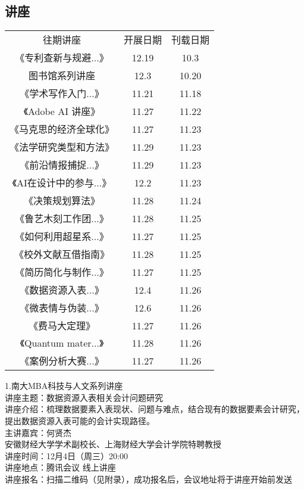 \documentclass[letterpaper, 12pt]{article}
\begin{document}
\begin{multicols}{2}

\section{讲座}
\begin{tabular}{|c|c|c|}
    \hline
    往期讲座 & 开展日期 & 刊载日期\\
    《专利查新与规避...》 & 12.19 & 10.3\\
    图书馆系列讲座 & 12.3 & 10.20\\
    《学术写作入门...》& 11.21 & 11.18\\
    《Adobe AI 讲座》 & 11.27 & 11.22\\
    《马克思的经济全球化》 & 11.27 & 11.23\\
    《法学研究类型和方法》 & 11.29 & 11.23\\
    《前沿情报捕捉...》 & 11.29 & 11.23\\
    《AI在设计中的参与...》 & 12.2 & 11.23\\
    《决策规划算法》 & 11.28 & 11.24\\
    《鲁艺木刻工作团...》 & 11.28 & 11.25\\
    《如何利用超星系...》 & 11.27 & 11.25\\
    《校外文献互借指南》 & 11.28 & 11.25\\
    《简历简化与制作...》 & 11.27 & 11.25\\
    《数据资源入表...》 & 12.4 & 11.26\\
    《微表情与伪装...》 & 12.6 & 11.26\\
    《费马大定理》 & 11.27 & 11.26\\
    《Quantum mater...》 & 11.28 & 11.26\\
    《案例分析大赛...》 & 11.27 & 11.26\\
    \hline\hline

    
    \hline
\end{tabular}

1.南大MBA科技与人文系列讲座\\
讲座主题：数据资源入表相关会计问题研究\\
讲座介绍：梳理数据要素入表现状、问题与难点，结合现有的数据要素会计研究，提出数据资源入表可能的会计实现路径。\\
主讲嘉宾：何贤杰\\
安徽财经大学学术副校长、上海财经大学会计学院特聘教授\\
讲座时间：12月4日（周三）20:00\\
讲座地点：腾讯会议 线上讲座\\
讲座报名：扫描二维码（见附录），成功报名后，会议地址将于讲座开始前发送\\


\end{multicols}
\end{document}
